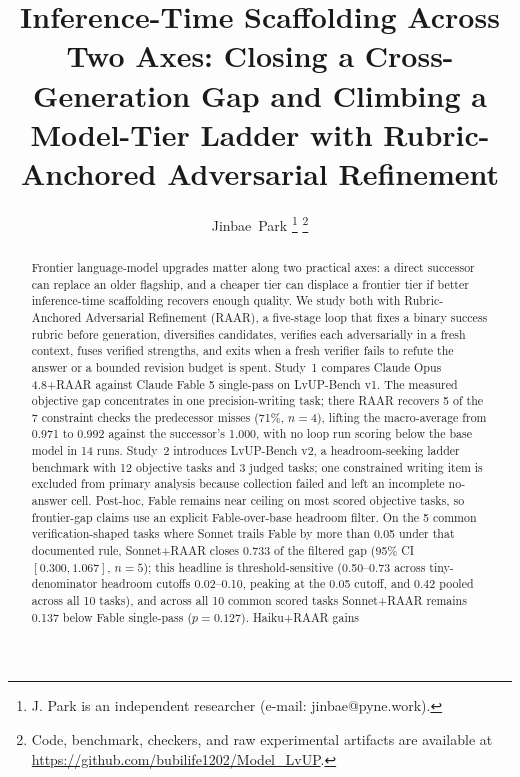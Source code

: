 \documentclass[journal]{IEEEtran}
\newcommand{\method}{RAAR}
\newcommand{\methodlong}{Rubric-Anchored Adversarial Refinement}
\newcommand{\bench}{LvUP-Bench}
\newcommand{\opus}{Claude Opus 4.8}
\newcommand{\fable}{Claude Fable 5}
\begin{document}
\title{Inference-Time Scaffolding Across Two Axes: Closing a
Cross-Generation Gap and Climbing a Model-Tier Ladder with
Rubric-Anchored Adversarial Refinement}

\author{Jinbae~Park%
\thanks{J. Park is an independent researcher (e-mail: jinbae@pyne.work).}%
\thanks{Code, benchmark, checkers, and raw experimental artifacts are available
at \url{https://github.com/bubilife1202/Model_LvUP}.}}


\maketitle

\begin{abstract}
Frontier language-model upgrades matter along two practical axes: a direct
successor can replace an older flagship, and a cheaper tier can displace a
frontier tier if better inference-time scaffolding recovers enough quality.
We study both with \methodlong{} (\method{}), a five-stage loop that fixes a
binary success rubric before generation, diversifies candidates, verifies
each adversarially in a fresh context, fuses verified strengths, and exits
when a fresh verifier fails to refute the answer or a bounded revision
budget is spent. Study~1 compares
\opus{}+\method{} against \fable{} single-pass on \bench{} v1. The measured
objective gap concentrates in one precision-writing task; there \method{}
recovers 5 of the 7 constraint checks the predecessor misses (71\%,
$n{=}4$), lifting the macro-average from 0.971 to 0.992 against the
successor's 1.000, with no loop run scoring below the base model in 14
runs. Study~2 introduces \bench{} v2, a headroom-seeking ladder benchmark
with 12 objective tasks and 3 judged tasks; one constrained writing item is
excluded from primary analysis because collection failed and left an
incomplete no-answer cell. Post-hoc, Fable remains near ceiling on most scored
objective tasks, so frontier-gap claims use an explicit Fable-over-base
headroom filter. On the 5 common verification-shaped tasks where Sonnet
trails Fable by more than 0.05 under that documented rule,
Sonnet+\method{} closes 0.733 of the filtered gap
(95\% CI $[0.300, 1.067]$, $n{=}5$); this headline is threshold-sensitive
(0.50--0.73 across tiny-denominator headroom cutoffs 0.02--0.10, peaking
at the 0.05 cutoff, and 0.42 pooled across all 10 tasks), and across all 10 common scored tasks
Sonnet+\method{} remains 0.137 below Fable single-pass ($p{=}0.127$). Haiku+\method{} gains

\end{abstract}
\end{document}
